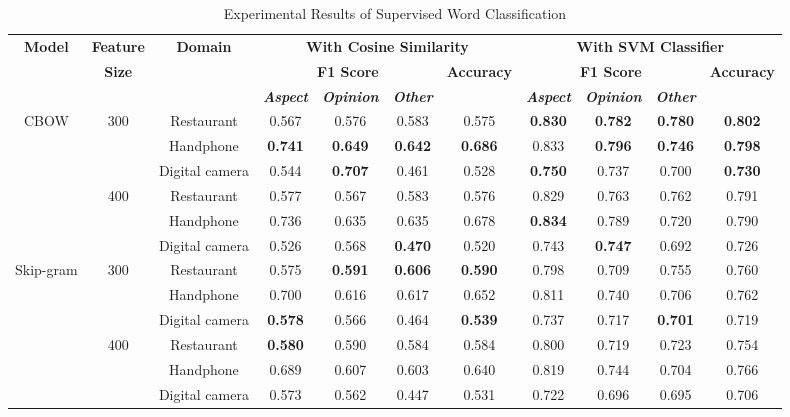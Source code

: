 \documentclass[a4paper,conference]{IEEEtran}
\begin{document}
\begin{table}[htbp]
\caption{Experimental Results of Supervised Word Classification}
\begin{center}
\begin{tabular}{|c|c|c|c|c|c|c|c|c|c|c|}
\hline
\textbf{Model}&\textbf{Feature}&\textbf{Domain}&\multicolumn{4}{|c|}{\textbf{With Cosine Similarity}}&\multicolumn{4}{|c|}{\textbf{With SVM Classifier}}\\
\cline{4-11}
&\textbf{Size}& &\multicolumn{3}{|c|}{\textbf{F1 Score}}&\textbf{Accuracy}&\multicolumn{3}{|c|}{\textbf{F1 Score}}&\textbf{Accuracy}\\
\cline{4-6}\cline{8-10}
& & &\textbf{\textit{Aspect}}&\textbf{\textit{Opinion}}&\textbf{\textit{Other}}& &\textbf{\textit{Aspect}}&\textbf{\textit{Opinion}}&\textbf{\textit{Other}}& \\
\hline
CBOW&300&Restaurant&0.567&0.576&0.583&0.575&\textbf{0.830}&\textbf{0.782}&\textbf{0.780}&\textbf{0.802} \\
\cline{3-11}
&&Handphone&\textbf{0.741}&\textbf{0.649}&\textbf{0.642}&\textbf{0.686}&0.833&\textbf{0.796}&\textbf{0.746}&\textbf{0.798} \\
\cline{3-11}
&&Digital camera&0.544&\textbf{0.707}&0.461&0.528&\textbf{0.750}&0.737&0.700&\textbf{0.730} \\
\cline{2-11}
&400&Restaurant&0.577&0.567&0.583&0.576&0.829&0.763&0.762&0.791 \\
\cline{3-11}
&&Handphone&0.736&0.635&0.635&0.678&\textbf{0.834}&0.789&0.720&0.790 \\
\cline{3-11}
&&Digital camera&0.526&0.568&\textbf{0.470}&0.520&0.743&\textbf{0.747}&0.692&0.726 \\
\hline
Skip-gram&300&Restaurant&0.575&\textbf{0.591}&\textbf{0.606}&\textbf{0.590}&0.798&0.709&0.755&0.760 \\
\cline{3-11}
&&Handphone&0.700&0.616&0.617&0.652&0.811&0.740&0.706&0.762 \\
\cline{3-11}
&&Digital camera&\textbf{0.578}&0.566&0.464&\textbf{0.539}&0.737&0.717&\textbf{0.701}&0.719 \\
\cline{2-11}
&400&Restaurant&\textbf{0.580}&0.590&0.584&0.584&0.800&0.719&0.723&0.754 \\
\cline{3-11}
&&Handphone&0.689&0.607&0.603&0.640&0.819&0.744&0.704&0.766 \\
\cline{3-11}
&&Digital camera&0.573&0.562&0.447&0.531&0.722&0.696&0.695&0.706 \\
\hline
\end{tabular}
\label{tab6}
\end{center}
\end{table}
\end{document}
